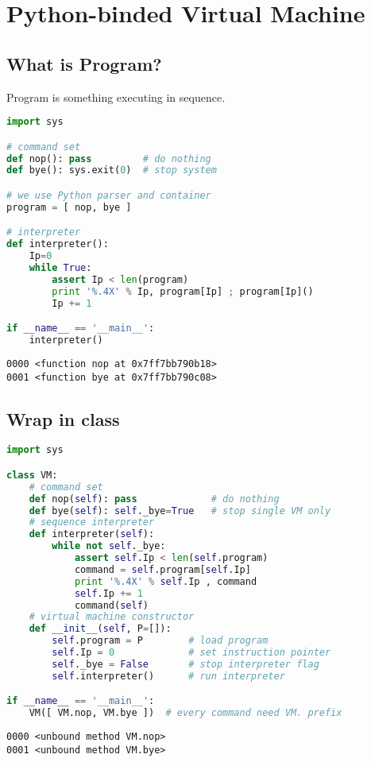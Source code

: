 \chapter{Python-binded Virtual Machine}
\clearpage

\section{What is Program?}

Program is something executing in sequence.

\begin{lstlisting}[language=python]
import sys

# command set
def nop(): pass         # do nothing
def bye(): sys.exit(0)  # stop system

# we use Python parser and container
program = [ nop, bye ]

# interpreter
def interpreter():
    Ip=0
    while True:
        assert Ip < len(program)
        print '%.4X' % Ip, program[Ip] ; program[Ip]()
        Ip += 1

if __name__ == '__main__':
    interpreter()
\end{lstlisting}
\begin{lstlisting}
0000 <function nop at 0x7ff7bb790b18>
0001 <function bye at 0x7ff7bb790c08>
\end{lstlisting}

\section{Wrap in class}

\begin{lstlisting}[language=python]
import sys

class VM:
    # command set
    def nop(self): pass             # do nothing
    def bye(self): self._bye=True   # stop single VM only
    # sequence interpreter
    def interpreter(self):
        while not self._bye:
            assert self.Ip < len(self.program)
            command = self.program[self.Ip]
            print '%.4X' % self.Ip , command
            self.Ip += 1
            command(self)
    # virtual machine constructor
    def __init__(self, P=[]):
        self.program = P        # load program
        self.Ip = 0             # set instruction pointer
        self._bye = False       # stop interpreter flag
        self.interpreter()      # run interpreter

if __name__ == '__main__':
    VM([ VM.nop, VM.bye ])  # every command need VM. prefix
\end{lstlisting}
\begin{lstlisting}
0000 <unbound method VM.nop>
0001 <unbound method VM.bye>
\end{lstlisting}

